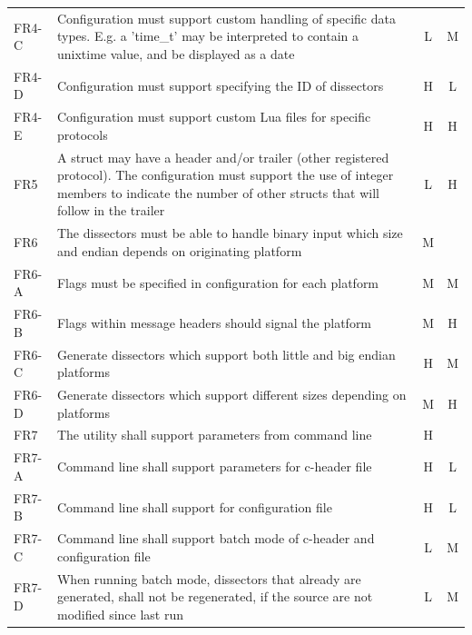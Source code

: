 \begin{table}[htbp]
{\begin{tabularx}{1.2\textwidth}{l X c c}
	FR4-C & Configuration must support custom handling of specific data types. E.g. a 'time\_t' may be interpreted to contain a unixtime value, and be displayed as a date & L & M \\
	FR4-D & Configuration must support specifying the ID of dissectors & H & L \\
	FR4-E & Configuration must support custom Lua files for specific protocols & H & H \\
	\midrule
	FR5 & A struct may have a header and/or trailer (other registered protocol). The configuration must support the use of integer members to indicate the number of other structs that will follow in the trailer & L & H \\
	\midrule
	FR6 & The dissectors must be able to handle binary input which size and endian depends on originating platform & M & \\
	FR6-A & Flags must be specified in configuration for each platform & M & M \\
	FR6-B & Flags within message headers should signal the platform & M & H \\
	FR6-C & Generate dissectors which support both little and big endian platforms & H & M \\
	FR6-D & Generate dissectors which support different sizes depending on platforms & M & H \\
	\midrule
	FR7 & The utility shall support parameters from command line & H & \\
	FR7-A & Command line shall support parameters for c-header file & H & L \\
	FR7-B & Command line shall support for configuration file & H & L \\
	FR7-C & Command line shall support batch mode of c-header and configuration file & L & M \\
	FR7-D & When running batch mode, dissectors that already are generated, shall not be regenerated, if the source are not modified since last run & L & M \\
	\bottomrule
\end{tabularx}}
\end{table}

